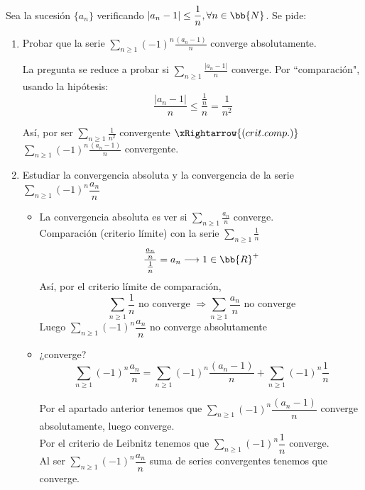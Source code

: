 \documentclass[12pt]{article}
\begin{document}
    \begin{ejercicio}[3 puntos]
        Sea la sucesión $\{a_n\}$ verificando $|a_n-1| \leq \dfrac{1}{n}, \forall n \in \bb{N}$. Se pide:
        \begin{enumerate}
            \item Probar que la serie $\sum\limits_{n\geq 1} (-1)^{n} \frac{(a_n-1)}{n}$ converge absolutamente.

            La pregunta se reduce a probar si $\sum\limits_{n\geq 1}\frac{|a_n-1|}{n}$ converge. Por ``comparación", usando la hipótesis:
            \[
            \dfrac{|a_n-1|}{n} \leq \dfrac{\frac{1}{n}}{n} = \dfrac{1}{n^2}
            \]

            Así, por ser $\sum\limits_{n\geq 1} \frac{1}{n^2}$ convergente $\xRightarrow{(crit. comp.)}$ $\sum\limits_{n\geq 1} (-1)^{n} \frac{(a_n-1)}{n}$ convergente.
            
            \item Estudiar la convergencia absoluta y la convergencia de la serie $\sum\limits_{n\geq 1} (-1)^{n} \dfrac{a_n}{n}$

            \begin{itemize}
                \item La convergencia absoluta es ver si $\sum\limits_{n\geq 1} \frac{a_n}{n}$ converge.\\
                Comparación (criterio límite) con la serie $\sum\limits_{n\geq 1} \frac{1}{n}$
                \[
                    \dfrac{\frac{a_n}{n}}{\frac{1}{n}} = a_n \longrightarrow 1\in \bb{R}^+
                \]
                Así, por el criterio límite de comparación,
                \[
                    \sum\limits_{n\geq 1} \frac{1}{n} \text{ no converge } \Longrightarrow \sum\limits_{n\geq 1} \frac{a_n}{n} \text{ no converge}
                \]
                Luego $\sum\limits_{n\geq 1} (-1)^{n} \dfrac{a_n}{n}$ no converge absolutamente

                \item ¿converge?
                \[
                    \sum\limits_{n\geq 1} (-1)^{n} \dfrac{a_n}{n} = \sum\limits_{n\geq 1} (-1)^{n} \dfrac{(a_n-1)}{n} + \sum\limits_{n\geq 1} (-1)^{n} \dfrac{1}{n}
                \]

                Por el apartado anterior tenemos que $\sum\limits_{n\geq 1} (-1)^{n} \dfrac{(a_n -1)}{n}$ converge absolutamente, luego converge.\\
                Por el criterio de Leibnitz tenemos que $\sum\limits_{n\geq 1} (-1)^{n} \dfrac{1}{n}$ converge.\\
                Al ser $\sum\limits_{n\geq 1} (-1)^{n} \dfrac{a_n}{n}$ suma de series convergentes tenemos que converge.
                
            \end{itemize}
        \end{enumerate}
    \end{ejercicio}
\end{document}
